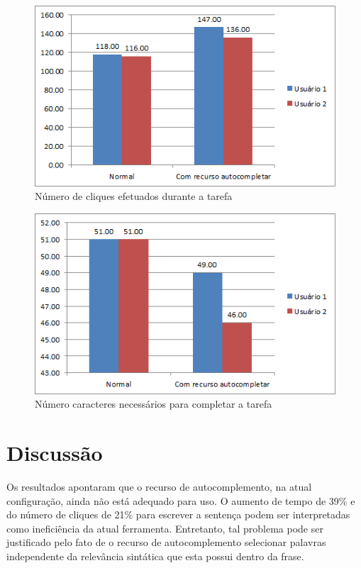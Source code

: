 \documentclass[twoside]{article}
\begin{document}
\begin{multicols}{2}
\begin{figure}[H]
\label{fig:graph_numcliq}
  \caption{Número de cliques efetuados durante a tarefa}
  \centering
    \includegraphics[scale = 0.50]{graph_ncliques.png}
\end{figure}

\begin{figure}[H]
\label{fig:graph_numcaractnec}
  \caption{Número caracteres necessários para completar a tarefa}
  \centering
    \includegraphics[scale = 0.50]{graph_caractnec.png}
\end{figure}

\section{Discussão}
Os resultados apontaram que o recurso de autocomplemento, na atual configuração, ainda não está adequado para uso. O aumento de tempo de 39\% e do número de cliques de 21\% para escrever a sentença podem ser interpretadas como ineficiência da atual ferramenta. Entretanto, tal problema pode ser justificado pelo fato de o recurso de autocomplemento selecionar palavras independente da relevância sintática que esta possui dentro da frase. 


\end{multicols}
\end{document}
